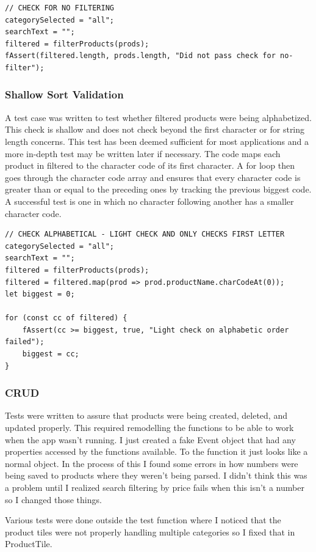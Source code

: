 \documentclass{article}[12pt]
\begin{document}
\begin{lstlisting}
// CHECK FOR NO FILTERING
categorySelected = "all";
searchText = "";
filtered = filterProducts(prods);
fAssert(filtered.length, prods.length, "Did not pass check for no-filter");
\end{lstlisting}

\subsubsection{Shallow Sort Validation}
A test case was written to test whether filtered products were being alphabetized. This check is shallow and does not check beyond the first character or for string length concerns. This test has been deemed sufficient for most applications and a more in-depth test may be written later if necessary. The code maps each product in filtered to the character code of its first character. A for loop then goes through the character code array and ensures that every character code is greater than or equal to the preceding ones by tracking the previous biggest code. A successful test is one in which no character following another has a smaller character code.

\begin{lstlisting}
// CHECK ALPHABETICAL - LIGHT CHECK AND ONLY CHECKS FIRST LETTER
categorySelected = "all";
searchText = "";
filtered = filterProducts(prods);
filtered = filtered.map(prod => prod.productName.charCodeAt(0));
let biggest = 0;

for (const cc of filtered) {
    fAssert(cc >= biggest, true, "Light check on alphabetic order failed");
    biggest = cc;
}
\end{lstlisting}

\subsubsection{CRUD}
Tests were written to assure that products were being created, deleted, and updated properly. This required remodelling the functions to be able to work when the app wasn't running. I just created a fake Event object that had any properties accessed by the functions available. To the function it just looks like a normal object. In the process of this I found some errors in how numbers were being saved to products where they weren't being parsed. I didn't think this was a problem until I realized search filtering by price fails when this isn't a number so I changed those things. 

Various tests were done outside the test function where I noticed that the product tiles were not properly handling multiple categories so I fixed that in ProductTile.
\end{document}

